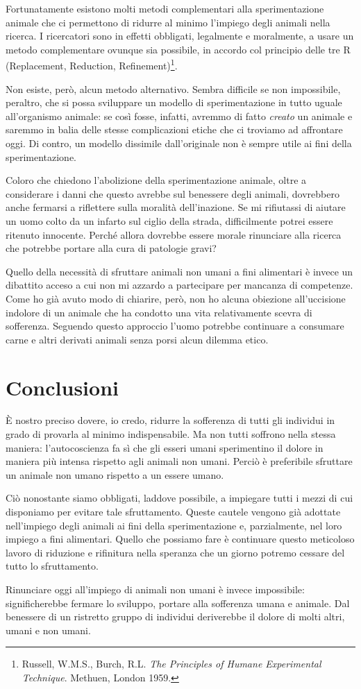 \documentclass[a4paper,11pt,oneside,article]{memoir}
\begin{document}
Fortunatamente esistono molti metodi complementari alla sperimentazione animale
che ci permettono di ridurre al minimo l'impiego degli animali nella ricerca. I
ricercatori sono in effetti obbligati, legalmente e moralmente, a usare un
metodo complementare ovunque sia possibile, in accordo col principio delle tre R
(Replacement, Reduction, Refinement)\footnote{Russell, W.M.S., Burch, R.L.
\emph{The Principles of Humane Experimental Technique}. Methuen, London 1959.}.

Non esiste, però, alcun metodo alternativo. Sembra difficile se non impossibile,
peraltro, che si possa sviluppare un modello di sperimentazione in tutto uguale
all'organismo animale: se così fosse, infatti, avremmo di fatto \emph{creato} un
animale e saremmo in balia delle stesse complicazioni etiche che ci troviamo ad
affrontare oggi. Di contro, un modello dissimile dall'originale non è sempre
utile ai fini della sperimentazione.

Coloro che chiedono l'abolizione della sperimentazione animale, oltre a
considerare i danni che questo avrebbe sul benessere degli animali, dovrebbero
anche fermarsi a riflettere sulla moralità dell'inazione. Se mi rifiutassi di
aiutare un uomo colto da un infarto sul ciglio della strada, difficilmente
potrei essere ritenuto innocente. Perché allora dovrebbe essere morale
rinunciare alla ricerca che potrebbe portare alla cura di patologie gravi?

Quello della necessità di sfruttare animali non umani a fini alimentari è invece
un dibattito acceso a cui non mi azzardo a partecipare per mancanza di
competenze. Come ho già avuto modo di chiarire, però, non ho alcuna obiezione
all'uccisione indolore di un animale che ha condotto una vita relativamente
scevra di sofferenza. Seguendo questo approccio l'uomo potrebbe continuare a
consumare carne e altri derivati animali senza porsi alcun dilemma etico.

\chapter{Conclusioni}

È nostro preciso dovere, io credo, ridurre la sofferenza di tutti gli individui
in grado di provarla al minimo indispensabile. Ma non tutti soffrono nella
stessa maniera: l'autocoscienza fa sì che gli esseri umani sperimentino il
dolore in maniera più intensa rispetto agli animali non umani. Perciò è
preferibile sfruttare un animale non umano rispetto a un essere umano.

Ciò nonostante siamo obbligati, laddove possibile, a impiegare tutti i mezzi di
cui disponiamo per evitare tale sfruttamento. Queste cautele vengono già
adottate nell'impiego degli animali ai fini della sperimentazione e,
parzialmente, nel loro impiego a fini alimentari. Quello che possiamo fare è
continuare questo meticoloso lavoro di riduzione e rifinitura nella speranza che
un giorno potremo cessare del tutto lo sfruttamento.

Rinunciare oggi all'impiego di animali non umani è invece impossibile:
significherebbe fermare lo sviluppo, portare alla sofferenza umana e animale.
Dal benessere di un ristretto gruppo di individui deriverebbe il dolore di molti
altri, umani e non umani.
\end{document}
